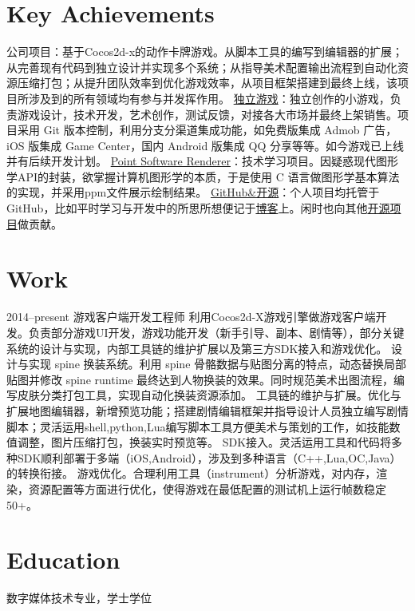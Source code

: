 \documentclass[full]{rvca}
\begin{document}
\section{Key Achievements}

\achievements
{公司项目：基于Cocos2d-x的动作卡牌游戏。从脚本工具的编写到编辑器的扩展；从完善现有代码到独立设计并实现多个系统；从指导美术配置输出流程到自动化资源压缩打包；从提升团队效率到优化游戏效率，从项目框架搭建到最终上线，该项目所涉及到的所有领域均有参与并发挥作用。}
{\href{http://a.app.qq.com/o/simple.jsp?pkgname=com.kode.Thirteen}{独立游戏}：独立创作的小游戏，负责游戏设计，技术开发，艺术创作，测试反馈，对接各大市场并最终上架销售。项目采用 Git 版本控制，利用分支分渠道集成功能，如免费版集成 Admob 广告，iOS 版集成 Game Center，国内 Android 版集成 QQ 分享等等。如今游戏已上线并有后续开发计划。}
{\href{https://github.com/keyring/point}{Point Software Renderer}：技术学习项目。因疑惑现代图形学API的封装，欲掌握计算机图形学的本质，于是使用 C 语言做图形学基本算法的实现，并采用ppm文件展示绘制结果。}
{\href{http://github.com/keyring}{GitHub\&开源}：个人项目均托管于 GitHub，比如平时学习与开发中的所思所想便记于\href{http://www.photoneray.com}{博客}上。闲时也向其他\href{https://github.com/cloudwu/lua53doc/graphs/contributors}{开源项目}做贡献。}
{}

\section{Work}


{2014--present}%
{游戏客户端开发工程师} %
{利用Cocos2d-X游戏引擎做游戏客户端开发。负责部分游戏UI开发，游戏功能开发（新手引导、副本、剧情等），部分关键系统的设计与实现，内部工具链的维护扩展以及第三方SDK接入和游戏优化。}%
{设计与实现 spine 换装系统。利用 spine 骨骼数据与贴图分离的特点，动态替换局部贴图并修改 spine runtime 最终达到人物换装的效果。同时规范美术出图流程，编写皮肤分类打包工具，实现自动化换装资源添加。}
{工具链的维护与扩展。优化与扩展地图编辑器，新增预览功能；搭建剧情编辑框架并指导设计人员独立编写剧情脚本；灵活运用shell,python,Lua编写脚本工具方便美术与策划的工作，如技能数值调整，图片压缩打包，换装实时预览等。}
{SDK接入。灵活运用工具和代码将多种SDK顺利部署于多端（iOS,Android），涉及到多种语言（C++,Lua,OC,Java）的转换衔接。}
{游戏优化。合理利用工具（instrument）分析游戏，对内存，渲染，资源配置等方面进行优化，使得游戏在最低配置的测试机上运行帧数稳定50+。}
{}

\section{Education}

数字媒体技术专业，学士学位
\end{document}
